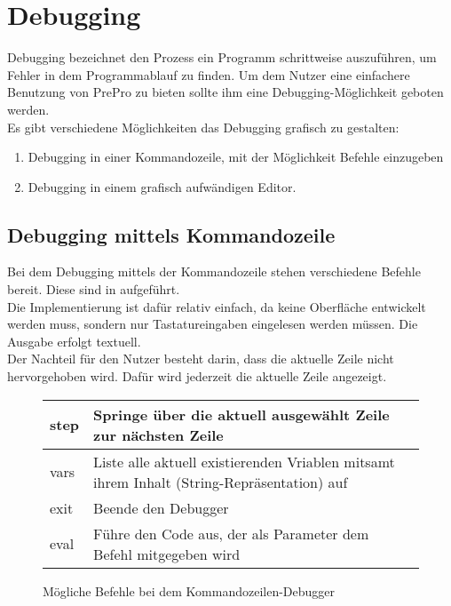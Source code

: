\section{Debugging}
Debugging bezeichnet den Prozess ein Programm schrittweise auszuführen, um Fehler in dem Programmablauf zu finden.
Um dem Nutzer eine einfachere Benutzung von PrePro zu bieten sollte ihm eine Debugging-Möglichkeit geboten werden.\\
Es gibt verschiedene Möglichkeiten das Debugging grafisch zu gestalten:
\begin{enumerate}
\item Debugging in einer Kommandozeile, mit der Möglichkeit Befehle einzugeben
\item Debugging in einem grafisch aufwändigen Editor.
\end{enumerate}

\subsection{Debugging mittels Kommandozeile}
Bei dem Debugging mittels der Kommandozeile stehen verschiedene Befehle bereit.
Diese sind in  aufgeführt.\\
Die Implementierung ist dafür relativ einfach, da keine Oberfläche entwickelt werden muss, sondern nur Tastatureingaben eingelesen werden müssen.
Die Ausgabe erfolgt textuell.\\
Der Nachteil für den Nutzer besteht darin, dass die aktuelle Zeile nicht hervorgehoben wird.
Dafür wird jederzeit die aktuelle Zeile angezeigt.

\begin{figure}
	\centering
	\begin{tabular}{| m{4cm} | m{9cm} |}
	\hline
	step & Springe über die aktuell ausgewählt Zeile zur nächsten Zeile \\ \hline
	vars & Liste alle aktuell existierenden Vriablen mitsamt ihrem Inhalt (String-Repräsentation) auf \\ \hline
	exit & Beende den Debugger \\ \hline
	eval & Führe den Code aus, der als Parameter dem Befehl mitgegeben wird \\ \hline
	\end{tabular}
	\caption{Mögliche Befehle bei dem Kommandozeilen-Debugger}
	\label{fig:Commands_CLI_Debugger}
\end{figure}

